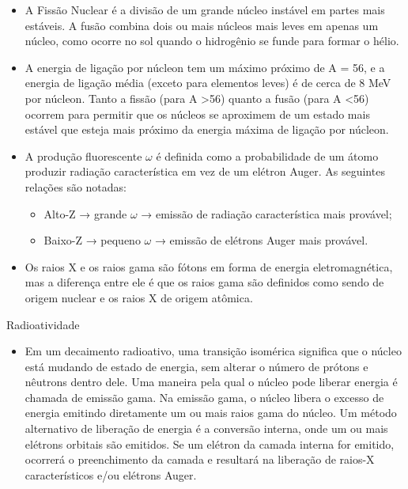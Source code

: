 \documentclass[11pt,a4paper]{article}
\newcounter{exemplo}
\begin{document}
\begin{exemplo}
\begin{itemize}
        \item A Fissão Nuclear é a divisão de um grande núcleo instável em partes mais estáveis. A fusão combina dois ou mais núcleos mais leves em apenas um núcleo, como ocorre no sol quando o hidrogênio se funde para formar o hélio.
        
        \item A energia de ligação por núcleon tem um máximo próximo de A = 56, e a energia de ligação média (exceto para elementos leves) é de cerca de 8 MeV por núcleon. Tanto a fissão (para A >56) quanto a fusão (para A <56) ocorrem para permitir que os núcleos se aproximem de um estado mais estável que esteja mais próximo da energia máxima de ligação por núcleon.
        
        \item A produção fluorescente $\omega$ é definida como a probabilidade de um átomo produzir radiação característica em vez de um elétron Auger. As seguintes relações são notadas:
            \begin{itemize}
                \item Alto-Z → grande $\omega$ → emissão de radiação característica mais provável;
                \item Baixo-Z → pequeno $\omega$ → emissão de elétrons Auger mais provável.
            \end{itemize}
           
       \item Os raios X e os raios gama são fótons em forma de energia eletromagnética, mas a diferença entre ele é que os raios gama são definidos como sendo de origem nuclear e os raios X de origem atômica.
       
       
    \end{itemize}

    \textcolor{CarnationPink}{Radioatividade}

    \begin{itemize}
        \item Em um decaimento radioativo, uma transição isomérica significa que o núcleo está mudando de estado de energia, sem alterar o número de prótons e nêutrons dentro dele. Uma maneira pela qual o núcleo pode liberar energia é chamada de emissão gama. Na emissão gama, o núcleo libera o excesso de energia emitindo diretamente um ou mais raios gama do núcleo. Um método alternativo de liberação de energia é a conversão interna, onde um ou mais elétrons orbitais são emitidos. Se um elétron da camada interna for emitido, ocorrerá o preenchimento da camada e resultará na liberação de raios-X característicos e/ou elétrons Auger.
       

\end{itemize}
\end{exemplo}
\end{document}
